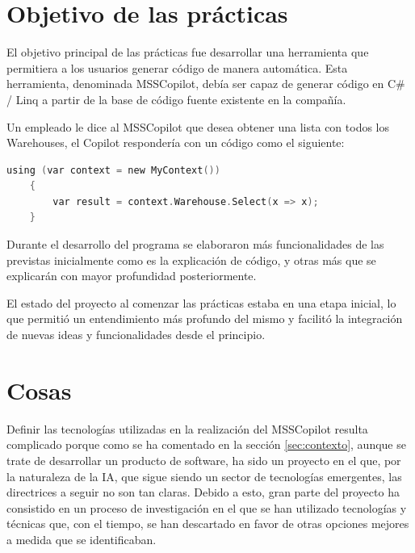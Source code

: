 

\section{Objetivo de las prácticas}
El objetivo principal de las prácticas fue desarrollar una herramienta que permitiera a los usuarios generar código de manera automática. Esta herramienta, denominada MSSCopilot, debía ser capaz de generar código en C\# / Linq a partir de la base de código fuente existente en la compañía.

\begin{examplebox}

Un empleado le dice al MSSCopilot que desea obtener una lista con todos los Warehouses, el Copilot respondería con un código como el siguiente:

\begin{lstlisting}[language=C]
    using (var context = new MyContext())
    {
        var result = context.Warehouse.Select(x => x);
    }
    \end{lstlisting}
\end{examplebox}        

Durante el desarrollo del programa se elaboraron más funcionalidades de las previstas inicialmente como es la explicación de código, y otras más que se explicarán con mayor profundidad posteriormente.

El estado del proyecto al comenzar las prácticas estaba en una etapa inicial, lo que permitió un entendimiento más profundo del mismo y facilitó la integración de nuevas ideas y funcionalidades desde el principio. 

\section{Cosas}

Definir las tecnologías utilizadas en la realización del MSSCopilot resulta complicado porque como se ha comentado en la sección \ref{sec:contexto}, aunque se trate de desarrollar un producto de software, ha sido un proyecto en el que, por la naturaleza de la IA, que sigue siendo un sector de tecnologías emergentes, las directrices a seguir no son tan claras. Debido a esto, gran parte del proyecto ha consistido en un proceso de investigación en el que se han utilizado tecnologías y técnicas que, con el tiempo, se han descartado en favor de otras opciones mejores a medida que se identificaban.

